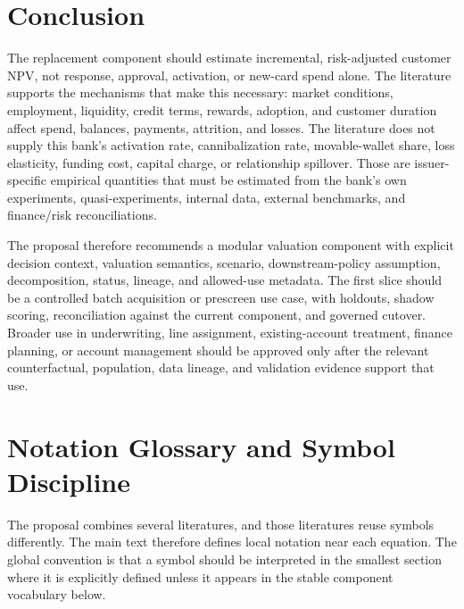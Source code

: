 \documentclass[11pt]{article}
\newcommand{\1}{\mathbf{1}}
\begin{document}
\section{Conclusion}
\label{sec:conclusion}

The replacement component should estimate incremental, risk-adjusted customer
NPV, not response, approval, activation, or new-card spend alone. The
literature supports the mechanisms that make this necessary: market
conditions, employment, liquidity, credit terms, rewards, adoption, and
customer duration affect spend, balances, payments, attrition, and losses. The
literature does not supply this bank's activation rate, cannibalization rate,
movable-wallet share, loss elasticity, funding cost, capital charge, or
relationship spillover. Those are issuer-specific empirical quantities that
must be estimated from the bank's own experiments, quasi-experiments, internal
data, external benchmarks, and finance/risk reconciliations.

The proposal therefore recommends a modular valuation component with explicit
decision context, valuation semantics, scenario, downstream-policy assumption,
decomposition, status, lineage, and allowed-use metadata. The first slice
should be a controlled batch acquisition or prescreen use case, with holdouts,
shadow scoring, reconciliation against the current component, and governed
cutover. Broader use in underwriting, line assignment, existing-account
treatment, finance planning, or account management should be approved only
after the relevant counterfactual, population, data lineage, and validation
evidence support that use.

\appendix

\section{Notation Glossary and Symbol Discipline}
\label{sec:notation-glossary}

The proposal combines several literatures, and those literatures reuse symbols
differently. The main text therefore defines local notation near each equation.
The global convention is that a symbol should be interpreted in the smallest
section where it is explicitly defined unless it appears in the stable
component vocabulary below.
\end{document}
